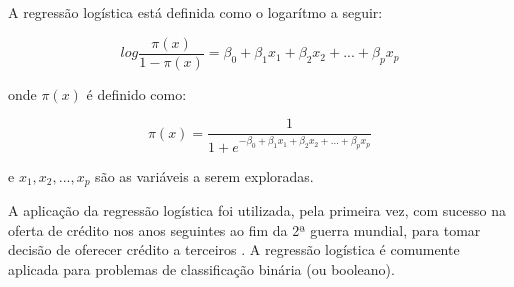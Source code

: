 A regressão logística está definida como o logarítmo a seguir:

\begin{equation}
 log{\frac{\pi(x)}{1-\pi(x)}} = \beta_0 + \beta_1 x_1 + \beta_2 x_2 + ... + \beta_p x_p
\end{equation}

onde $\pi(x)$ é definido como:

\begin{equation}
 \pi(x) = \dfrac{1}{1 + e^{-{\beta_0 + \beta_1 x_1 + \beta_2 x_2 + ... + \beta_p x_p}}}
\end{equation}

e $x_1, x_2,..., x_p$ são as variáveis a serem exploradas.


A aplicação da regressão logística foi utilizada, pela primeira vez, com sucesso na oferta de crédito nos anos seguintes ao fim da 2ª guerra mundial, para tomar decisão 
de oferecer crédito a terceiros \cite{RegrecaoLog}.
A regressão logística é comumente aplicada para problemas de classificação binária (ou booleano).
